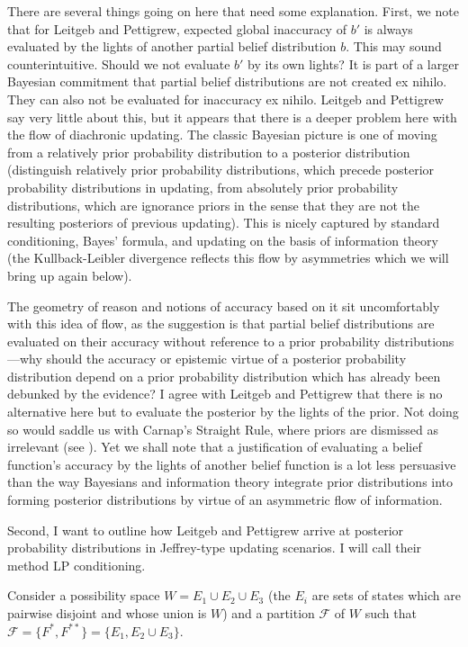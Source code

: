 \documentclass[11pt]{article}
\begin{document}
There are several things going on here that need some explanation.
First, we note that for Leitgeb and Pettigrew, expected global
inaccuracy of $b'$ is always evaluated by the lights of another
partial belief distribution $b$. This may sound counterintuitive.
Should we not evaluate $b'$ by its own lights? It is part of a larger
Bayesian commitment that partial belief distributions are not created
ex nihilo. They can also not be evaluated for inaccuracy ex nihilo.
Leitgeb and Pettigrew say very little about this, but it appears that
there is a deeper problem here with the flow of diachronic updating.
The classic Bayesian picture is one of moving from a relatively prior
probability distribution to a posterior distribution (distinguish
relatively prior probability distributions, which precede posterior
probability distributions in updating, from absolutely prior
probability distributions, which are ignorance priors in the sense
that they are not the resulting posteriors of previous updating). This
is nicely captured by standard conditioning, Bayes' formula, and
updating on the basis of information theory (the Kullback-Leibler
divergence reflects this flow by asymmetries which we will bring up
again below).

The geometry of reason and notions of accuracy based on it sit
uncomfortably with this idea of flow, as the suggestion is that
partial belief distributions are evaluated on their accuracy without
reference to a prior probability distributions---why should the
accuracy or epistemic virtue of a posterior probability distribution
depend on a prior probability distribution which has already been
debunked by the evidence? I agree with Leitgeb and Pettigrew that
there is no alternative here but to evaluate the posterior by the
lights of the prior. Not doing so would saddle us with Carnap's
Straight Rule, where priors are dismissed as irrelevant (see
). Yet we shall note that a justification of
evaluating a belief function's accuracy by the lights of another
belief function is a lot less persuasive than the way Bayesians and
information theory integrate prior distributions into forming
posterior distributions by virtue of an asymmetric flow of
information.

Second, I want to outline how Leitgeb and Pettigrew arrive at
posterior probability distributions in Jeffrey-type updating
scenarios. I will call their method LP conditioning. 

\begin{quotex}
  \label{ex:abstract} Consider a possibility
  space $W=E_{1}\cup{}E_{2}\cup{}E_{3}$ (the $E_{i}$ are sets of
  states which are pairwise disjoint and whose union is $W$) and a
  partition $\mathcal{F}$ of $W$ such that
  $\mathcal{F}=\{F^{*},F^{**}\}=\{E_{1},E_{2}\cup{}E_{3}\}$.
\end{quotex}
\end{document}

